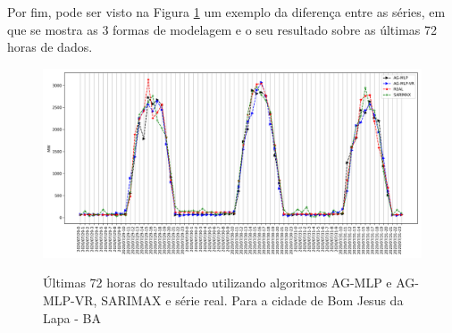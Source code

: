 Por fim, pode ser visto na Figura \ref{fig:cap4_bjl_3_days_hibrids} um exemplo da diferença entre as séries, em que se mostra as 3 formas de modelagem e o seu resultado sobre as últimas 72 horas de dados.

\begin{figure}[!htbp]
    \centering
    \caption{Últimas 72 horas do resultado utilizando algoritmos AG-MLP e AG-MLP-VR, SARIMAX e série real. Para a cidade de Bom Jesus da Lapa - BA}
    \includegraphics[width=\textwidth]{Figuras/results/comparison_hibrids_bjl.png}
    \label{fig:cap4_bjl_3_days_hibrids}
\end{figure}

